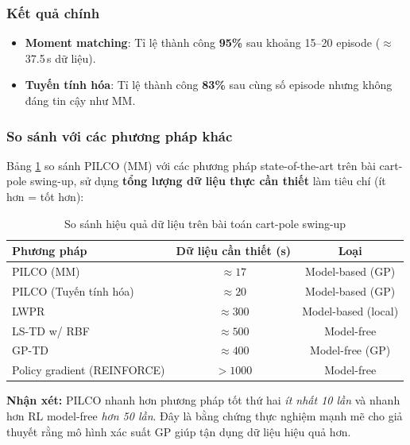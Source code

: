 \subsubsection{Kết quả chính}
\label{SUB_SUB_SEC_cp_main_results}

\begin{itemize}
    \item \textbf{Moment matching}: Tỉ lệ thành công \textbf{95\%} sau khoảng 15--20 episode ($\approx$37.5\,s dữ liệu).
    \item \textbf{Tuyến tính hóa}: Tỉ lệ thành công \textbf{83\%} sau cùng số episode nhưng không đáng tin cậy như MM.
\end{itemize}

\subsubsection{So sánh với các phương pháp khác}
\label{SUB_SUB_SEC_cp_comparison}

Bảng \ref{TAB_comparison} so sánh PILCO (MM) với các phương pháp state-of-the-art trên bài cart-pole swing-up, sử dụng \textbf{tổng lượng dữ liệu thực cần thiết} làm tiêu chí (ít hơn = tốt hơn):

\begin{table}[h!]
\centering
\caption{So sánh hiệu quả dữ liệu trên bài toán cart-pole swing-up}
\label{TAB_comparison}
\begin{tabular}{|l|c|c|}
\hline
\textbf{Phương pháp} & \textbf{Dữ liệu cần thiết (s)} & \textbf{Loại} \\\hline
PILCO (MM) \cite{Deisenroth_2015} & \textbf{$\approx 17$} & Model-based (GP) \\\hline
PILCO (Tuyến tính hóa) \cite{Deisenroth_2015} & $\approx 20$ & Model-based (GP) \\\hline
LWPR \cite{Schneider_1997} & $\approx 300$ & Model-based (local) \\\hline
LS-TD w/ RBF \cite{Lagoudakis_Parr_2003} & $\approx 500$ & Model-free \\\hline
GP-TD \cite{Engel_2005} & $\approx 400$ & Model-free (GP) \\\hline
Policy gradient (REINFORCE) & $> 1000$ & Model-free \\\hline
\end{tabular}
\end{table}

\textbf{Nhận xét:} PILCO nhanh hơn phương pháp tốt thứ hai \textit{ít nhất 10 lần} và nhanh hơn RL model-free \textit{hơn 50 lần}. Đây là bằng chứng thực nghiệm mạnh mẽ cho giả thuyết rằng mô hình xác suất GP giúp tận dụng dữ liệu hiệu quả hơn.

